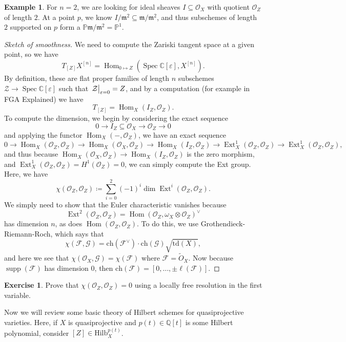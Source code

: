 \documentclass[leqno, openany]{memoir}
\theoremstyle{definition}
\newtheorem{exm}[thm]{Example}
\newtheorem{exer}[thm]{Exercise}
\theoremstyle{remark}
\theoremstyle{plain}
\theoremstyle{definition}
\theoremstyle{remark}
\newcommand{\C}{\mathbb{C}}
\newcommand{\Q}{\mathbb{Q}}
\renewcommand{\P}{\mathbb{P}}
\newcommand{\ep}{\varepsilon}
\newcommand{\mc}[1]{\mathcal{#1}}
\newcommand{\mf}[1]{\mathfrak{#1}}
\newcommand{\mr}[1]{\mathrm{#1}}
\newcommand{\wt}[1]{\widetilde{#1}}
\DeclareMathOperator{\Hom}{Hom}
\DeclareMathOperator{\supp}{supp}
\DeclareMathOperator{\Spec}{Spec}
\DeclareMathOperator{\Ext}{Ext}
\begin{document}
\begin{exm}
    For $n = 2$, we are looking for ideal sheaves $I \subseteq \mc{O}_X$ with quotient $\mc{O}_Z$ of length $2$. At a point $p$, we know $I/ \mf{m}^2 \subseteq \mf{m}/\mf{m}^2$, and thus subschemes of length $2$ supported on $p$ form a $\P \mf{m}/\mf{m}^2 = \P^1$.
\end{exm}

\begin{proof}[Sketch of smoothness]
    We need to compute the Zariski tangent space at a given point, so we have
    \[ T_{[Z]} X^{[n]} = \Hom_{0 \mapsto Z}(\Spec \C[\ep], X^{[n]}). \]
    By definition, these are flat proper families of length $n$ subschemes $\mc{Z} \to \Spec \C[\ep]$ such that $\eval{\mc{Z}}_{\ep = 0} = Z$, and by a computation (for example in FGA Explained) we have
    \[ T_{[Z]} = \Hom_X(I_Z, \mc{O}_Z). \]
    To compute the dimension, we begin by considering the exact sequence
    \[ 0 \to I_Z \subseteq \mc{O}_X \to \mc{O}_Z \to 0 \]
    and applying the functor $\Hom_X(-, \mc{O}_Z)$, we have an exact sequence
    \[ 0 \to \Hom_X(\mc{O}_Z, \mc{O}_Z) \to \Hom_X(\mc{O}_X, \mc{O}_Z) \to \Hom_X(I_Z, \mc{O}_Z) \to \Ext_X^1(\mc{O}_Z, \mc{O}_Z) \to \Ext_X^1(\mc{O}_Z, \mc{O}_Z), \]
    and thus because $\Hom_X(\mc{O}_X, \mc{O}_Z) \to \Hom_X(I_Z, \mc{O}_Z)$ is the zero morphism, and $\Ext_X^1(\mc{O}_Z, \mc{O}_Z) = H^1(\mc{O}_Z) = 0$, we can simply compute the Ext group. Here, we have
    \[ \chi(\mc{O}_Z, \mc{O}_Z) \coloneqq \sum_{i=0}^2 {(-1)}^i \dim \Ext^i (\mc{O}_Z, \mc{O}_Z). \]
    We simply need to show that the Euler characteristic vanishes because
    \[ \Ext^2(\mc{O}_Z, \mc{O}_Z) = {\Hom(\mc{O}_Z, \omega_X \otimes \mc{O}_Z)}^{\vee} \]
    has dimension $n$, as does $\Hom(\mc{O}_Z, \mc{O}_Z)$. To do this, we use Grothendieck-Riemann-Roch, which says that
    \[ \chi(\mc{F}, \mc{G}) = \mr{ch}(\mc{F}^{\vee}) \cdot \mr{ch}(\mc{G}) \sqrt{\mr{td}(X)}, \]
    and here we see that $\chi(\mc{O}_X, \mc{G}) = \chi(\mc{F})$ where $\mc{F} = \wt{O}_X$. Now because $\supp (\mc{F})$ has dimension $0$, then $\mr{ch}(\mc{F}) = [0, \ldots, \pm \ell (\mc{F})]$.
\end{proof}

\begin{exer}
    Prove that $\chi(\mc{O}_Z, \mc{O}_Z) = 0$ using a locally free resolution in the first variable.
\end{exer}

Now we will review some basic theory of Hilbert schemes for quasiprojective varieties. Here, if $X$ is quasiprojective and $p(t) \in \Q[t]$ is some Hilbert polynomial, consider $[Z] \in \mr{Hilb}_X^{p(t)}$.
\end{document}
